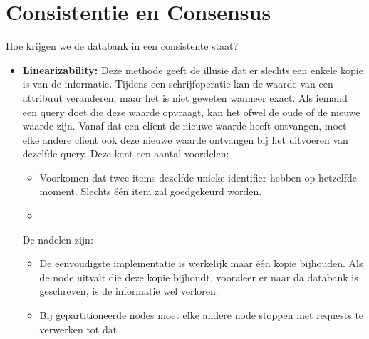 	

	\chapter{Consistentie en Consensus}
	\underline{Hoe krijgen we de databank in een consistente staat?}
	\begin{itemize}
		\item[\info] \textbf{Linearizability:} Deze methode geeft de illusie dat er slechts een enkele kopie is van de informatie. Tijdens een schrijfoperatie kan de waarde van een attribuut veranderen, maar het is niet geweten wanneer exact. Als iemand een query doet die deze waarde opvraagt, kan het ofwel de oude of de nieuwe waarde zijn. Vanaf dat een client de nieuwe waarde heeft ontvangen, moet elke andere client ook deze nieuwe waarde ontvangen bij het uitvoeren van dezelfde query.
		Deze kent een aantal voordelen:
		\begin{itemize}
			\item[\good] Voorkomen dat twee items dezelfde unieke identifier hebben op hetzelfde moment. Slechts één item zal goedgekeurd worden.
			\item[\good] 
		\end{itemize}
		De nadelen zijn:
		\begin{itemize}
			\item[\alert] De eenvoudigste implementatie is werkelijk maar één kopie bijhouden. Als de node uitvalt die deze kopie bijhoudt, vooraleer er naar da databank is geschreven, is de informatie wel verloren.
			\item[\alert] Bij gepartitioneerde nodes moet elke andere node stoppen met requests te verwerken tot dat 
		\end{itemize}
	\end{itemize}

	


	